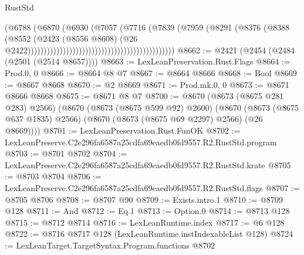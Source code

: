 \begin{lexlean}{RustStd}
\begin{coremodule}
                                                                      (@6788
                                                                        (@6870
                                                                          (@6930
                                                                            (@7057
                                                                              (@7716
                                                                                (@7839
                                                                                  (@7959
                                                                                    (@8291
                                                                                      (@8376
                                                                                        (@8388
                                                                                          (@8552
                                                                                            (@2423
                                                                                              (@8556
                                                                                                @8608)
                                                                                              (@26
                                                                                                @2422))))))))))))))))))))))))))))))))))))))))))))))
@8662 := @2421 (@2454 (@2484 (@2501 (@2514 @8657))))
@8663 := LexLeanPreservation.Rust.Flags
@8664 := Prod.{0, 0}
@8666 := @8664 @8 @7
@8667 := @8664 @8666
@8668 := Bool
@8669 := @8667 @8668
@8670 := @2 @8669
@8671 := Prod.mk.{0, 0}
@8673 := @8671 @8666 @8668
@8675 := @8671 @8 @7
@8700 := @8670
    (@8673 (@8675 @281 @283) @2566)
    (@8670
      (@8673 (@8675 @599 @92) @2600)
      (@8670 (@8673 (@8675 @637 @1835) @2566) (@8670 (@8673 (@8675 @69 @2297) @2566) (@26 @8669))))
@8701 := LexLeanPreservation.Rust.FunOK
@8702 := LexLeanPreserve.C2e296fa6587a25cdfa69eaedb0fd9557.R2.RustStd.program
@8703 := @8701 @8702
@8704 := LexLeanPreserve.C2e296fa6587a25cdfa69eaedb0fd9557.R2.RustStd.krate
@8705 := @8703 @8704
@8706 := LexLeanPreserve.C2e296fa6587a25cdfa69eaedb0fd9557.R2.RustStd.flags
@8707 := @8705 @8706
@8708 := @8707 @90
@8709 := Exists.intro.{1}
@8710 := @8709 @128
@8711 := And
@8712 := Eq.{1}
@8713 := Option.{0}
@8714 := @8713 @128
@8715 := @8712 @8714
@8716 := LexLeanRuntime.index
@8717 := @6 @128
@8722 := @8716 @8717 @128 (LexLeanRuntime.instIndexableList @128)
@8724 := LexLeanTarget.TargetSyntax.Program.functions @8702

\end{coremodule}
\end{lexlean}

